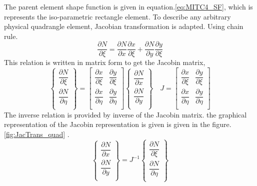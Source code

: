 \documentclass[main.tex]{subfiles}
\begin{document}
The parent element shape function is given in equation.\ref{eq:MITC4_SF}, which is represents the iso-parametric rectangle element. To describe any arbitrary physical quadrangle element, Jacobian transformation is adapted.
Using chain rule.
\begin{equation}
\dfrac{\partial N }{ \partial \xi } = 
\dfrac{\partial N }{ \partial x }
\dfrac{ \partial x }{\partial \xi }  
+
\dfrac{\partial N }{ \partial y }
\dfrac{ \partial y }{\partial \xi } 
\end{equation}
This relation is written in matrix form to get the Jacobin matrix, 
\begin{equation}
\left\{
\begin{array}{r}
\dfrac{\partial N }{ \partial \xi }  \\
\dfrac{\partial N }{ \partial \eta }  \\
\end{array}
\right\}
=
\begin{bmatrix}
\dfrac{ \partial x }{\partial \xi }   &
\dfrac{ \partial y }{\partial \xi } \\
\dfrac{ \partial x }{\partial \eta }   &
\dfrac{ \partial y }{\partial \eta } \\
\end{bmatrix}
\left\{
\begin{array}{r}
\dfrac{\partial N }{ \partial x }  \\
\dfrac{\partial N }{ \partial y }  \\
\end{array}
\right\}
\quad
J=\begin{bmatrix}
\dfrac{ \partial x }{\partial \xi }   &
\dfrac{ \partial y }{\partial \xi } \\
\dfrac{ \partial x }{\partial \eta }   &
\dfrac{ \partial y }{\partial \eta } \\
\end{bmatrix}
\end{equation}
The inverse relation is provided by inverse of the  Jacobin matrix. the graphical representation of the Jacobin representation is given is given in the figure.\ref{fig:JacTrans_quad} .
\begin{equation}
\left\{
\begin{array}{r}
\dfrac{\partial N }{ \partial x }  \\
\dfrac{\partial N }{ \partial y }  \\
\end{array}
\right\}
=
J^{-1}
\left\{
\begin{array}{r}
\dfrac{\partial N }{ \partial \xi }  \\
\dfrac{\partial N }{ \partial \eta }  \\
\end{array}
\right\}
\end{equation}
\end{document}
